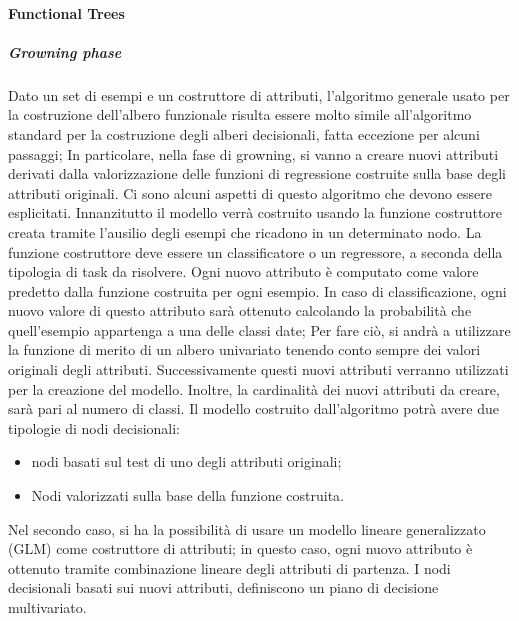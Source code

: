 \paragraph{Functional Trees}
\subparagraph{Growning phase}
	Dato un set di esempi e un costruttore di attributi, l'algoritmo generale usato per la costruzione dell'albero funzionale risulta essere molto simile all'algoritmo standard per la costruzione degli alberi decisionali, fatta eccezione per alcuni passaggi; In particolare, nella fase di growning, si vanno a creare nuovi attributi derivati dalla valorizzazione delle funzioni di regressione costruite sulla base degli attributi originali. Ci sono alcuni aspetti di questo algoritmo che devono essere esplicitati. Innanzitutto il modello verrà costruito usando la funzione costruttore creata tramite l'ausilio degli esempi che ricadono in un determinato nodo. La funzione costruttore deve essere un classificatore o un regressore, a seconda della tipologia di task da risolvere. Ogni nuovo attributo è computato come valore predetto dalla funzione costruita per ogni esempio. In caso di classificazione, ogni nuovo valore di questo attributo sarà ottenuto calcolando la probabilità che quell'esempio appartenga a una delle classi date; Per fare ciò, si andrà a utilizzare la funzione di merito di un albero univariato tenendo conto sempre dei valori originali degli attributi. Successivamente questi nuovi attributi verranno utilizzati per la creazione del modello. Inoltre, la cardinalità dei nuovi attributi da creare, sarà pari al numero di classi.
	Il modello costruito dall'algoritmo potrà avere due tipologie di nodi decisionali: 
	\begin{itemize}
		\item nodi basati sul test di uno degli attributi originali;
		\item Nodi valorizzati sulla base della funzione costruita.
	\end{itemize} 
	Nel secondo caso, si ha la possibilità di usare un modello lineare generalizzato (GLM) come costruttore di attributi; in questo caso, ogni nuovo attributo è ottenuto tramite combinazione lineare degli attributi di partenza. I nodi decisionali basati sui nuovi attributi, definiscono un piano di decisione multivariato.


